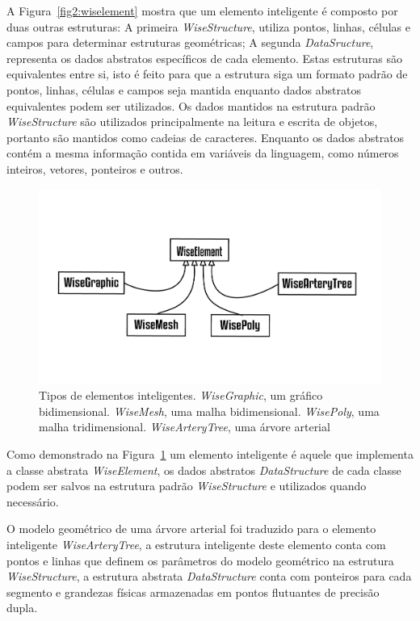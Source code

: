 \documentclass[a4paper,12pt]{monografia}
\theoremstyle{plain}
\theoremstyle{definition}
\theoremstyle{remark}
\begin{document}
A Figura~\ref{fig2:wiselement} mostra que um elemento inteligente é composto por duas outras estruturas: A primeira \textit{WiseStructure}, utiliza pontos, linhas, células e campos para determinar estruturas geométricas; A segunda \textit{DataSructure}, representa os dados abstratos específicos de cada elemento. Estas estruturas são equivalentes entre si, isto é feito para que a estrutura siga um formato padrão de pontos, linhas, células e campos seja mantida enquanto dados abstratos equivalentes podem ser utilizados. Os dados mantidos na estrutura padrão \textit{WiseStructure} são utilizados principalmente na leitura e escrita de objetos, portanto são mantidos como cadeias de caracteres. Enquanto os dados abstratos contém a mesma informação contida em variáveis da linguagem, como números inteiros, vetores, ponteiros e outros.

\begin{figure}[!htbp]
	\centering
	\includegraphics[scale=1]{Figures/WiseElements.png}
	\caption{Tipos de elementos inteligentes. \textit{WiseGraphic}, um gráfico bidimensional. \textit{WiseMesh}, uma malha bidimensional. \textit{WisePoly}, uma malha tridimensional. \textit{WiseArteryTree}, uma árvore arterial}
	\label{fig2:wiselements}
\end{figure}

Como demonstrado na Figura~\ref{fig2:wiselements} um elemento inteligente é aquele que implementa a classe abstrata \textit{WiseElement}, os dados abstratos \textit{DataStructure} de cada classe podem ser salvos na estrutura padrão \textit{WiseStructure} e utilizados quando necessário. 

O modelo geométrico de uma árvore arterial foi traduzido para o elemento inteligente \textit{WiseArteryTree}, a estrutura inteligente deste elemento conta com pontos e linhas que definem os parâmetros do modelo geométrico na estrutura \textit{WiseStructure}, a estrutura abstrata \textit{DataStructure} conta com ponteiros para cada segmento e grandezas físicas armazenadas em pontos flutuantes de precisão dupla.
\end{document}
